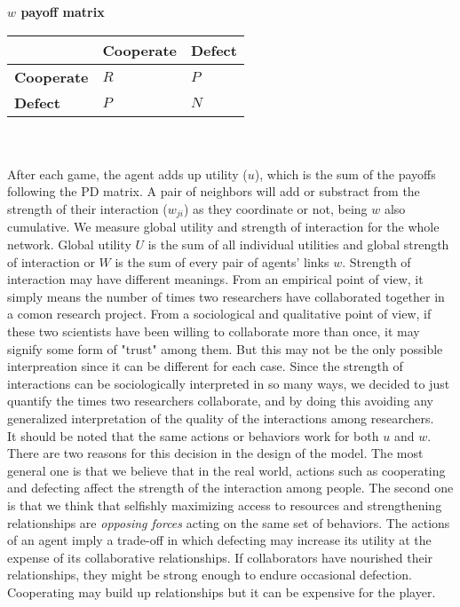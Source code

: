 \documentclass{bmcart}
\begin{document}
{\bf $w$ payoff matrix}\\

\begin{tabular}{| l | l | l |}
\hline
          & \bf{Cooperate} & \bf{Defect} \\ \hline
\bf{Cooperate} &  $R$      &  $P$   \\ \hline
\bf{Defect}    &  $P$      &  $N$   \\ \hline

\end{tabular}\\ \\


After each game, the agent adds up utility ($u$), which is the sum of the
payoffs following the PD matrix. A pair of neighbors will add or substract from the strength of
their interaction ($w_{ji}$) as they coordinate or not, being $w$
also cumulative. We measure global utility and strength of interaction for the whole
network. Global utility $U$ is the sum of all individual utilities and global
strength of interaction or $W$ is the sum of every pair of agents' links
$w$. Strength of interaction may have different meanings. From an empirical point of view, it simply means the number of times two researchers have collaborated together in a comon research project. From a sociological and qualitative point of view, if these two scientists have been willing to collaborate more than once, it may signify some form of "trust" among them. But this may not be the only possible interpreation since it can be different for each case. Since the strength of interactions can be sociologically interpreted in so many ways, we decided to just quantify the  times two researchers collaborate, and by doing this avoiding any generalized interpretation of the quality of the interactions among researchers. \\


It should be noted that the same actions or behaviors work for
  both $u$ and $w$. There are two reasons for this decision in the design of the
model. The most general one is that we believe that in the real world,
actions such as cooperating and defecting affect the strength of the interaction
among people. The second one is that we think that selfishly maximizing access to resources and
strengthening relationships are \emph{opposing forces} acting on the same set of
behaviors. The actions of an agent imply a trade-off in which defecting may
increase its utility at the expense of its collaborative relationships. If
collaborators have nourished their relationships, they might be strong enough to
endure occasional defection. Cooperating may build up relationships but it can be
expensive for the player.
\end{document}
